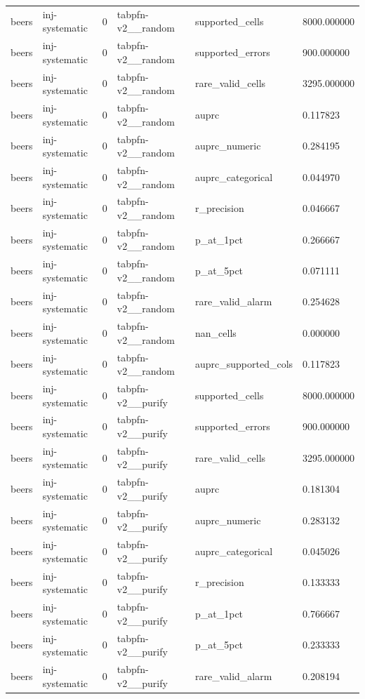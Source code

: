 \begin{tabular}{llllll}
beers & inj-systematic & 0 & tabpfn-v2\_\_random & supported\_cells & 8000.000000 \\
beers & inj-systematic & 0 & tabpfn-v2\_\_random & supported\_errors & 900.000000 \\
beers & inj-systematic & 0 & tabpfn-v2\_\_random & rare\_valid\_cells & 3295.000000 \\
beers & inj-systematic & 0 & tabpfn-v2\_\_random & auprc & 0.117823 \\
beers & inj-systematic & 0 & tabpfn-v2\_\_random & auprc\_numeric & 0.284195 \\
beers & inj-systematic & 0 & tabpfn-v2\_\_random & auprc\_categorical & 0.044970 \\
beers & inj-systematic & 0 & tabpfn-v2\_\_random & r\_precision & 0.046667 \\
beers & inj-systematic & 0 & tabpfn-v2\_\_random & p\_at\_1pct & 0.266667 \\
beers & inj-systematic & 0 & tabpfn-v2\_\_random & p\_at\_5pct & 0.071111 \\
beers & inj-systematic & 0 & tabpfn-v2\_\_random & rare\_valid\_alarm & 0.254628 \\
beers & inj-systematic & 0 & tabpfn-v2\_\_random & nan\_cells & 0.000000 \\
beers & inj-systematic & 0 & tabpfn-v2\_\_random & auprc\_supported\_cols & 0.117823 \\
beers & inj-systematic & 0 & tabpfn-v2\_\_purify & supported\_cells & 8000.000000 \\
beers & inj-systematic & 0 & tabpfn-v2\_\_purify & supported\_errors & 900.000000 \\
beers & inj-systematic & 0 & tabpfn-v2\_\_purify & rare\_valid\_cells & 3295.000000 \\
beers & inj-systematic & 0 & tabpfn-v2\_\_purify & auprc & 0.181304 \\
beers & inj-systematic & 0 & tabpfn-v2\_\_purify & auprc\_numeric & 0.283132 \\
beers & inj-systematic & 0 & tabpfn-v2\_\_purify & auprc\_categorical & 0.045026 \\
beers & inj-systematic & 0 & tabpfn-v2\_\_purify & r\_precision & 0.133333 \\
beers & inj-systematic & 0 & tabpfn-v2\_\_purify & p\_at\_1pct & 0.766667 \\
beers & inj-systematic & 0 & tabpfn-v2\_\_purify & p\_at\_5pct & 0.233333 \\
beers & inj-systematic & 0 & tabpfn-v2\_\_purify & rare\_valid\_alarm & 0.208194 \\

\end{tabular}
